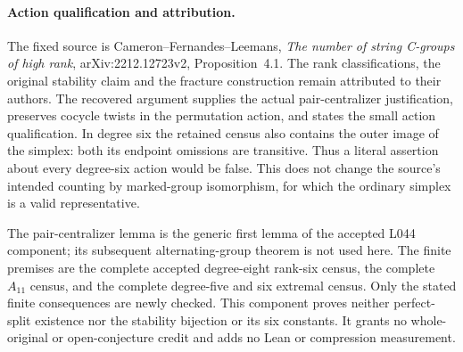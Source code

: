 \documentclass[11pt,a4paper]{article}
\begin{document}
\paragraph{Action qualification and attribution.}
The fixed source is Cameron--Fernandes--Leemans,
\emph{The number of string C-groups of high rank},
arXiv:2212.12723v2, Proposition~4.1. The rank classifications,
the original stability claim and the fracture construction
remain attributed to their authors. The recovered argument
supplies the actual pair-centralizer justification, preserves
cocycle twists in the permutation action, and states the small
action qualification. In degree six the retained census also
contains the outer image of the simplex: both its endpoint
omissions are transitive. Thus a literal assertion about every
degree-six action would be false. This does not change the
source's intended counting by marked-group isomorphism, for
which the ordinary simplex is a valid representative.

The pair-centralizer lemma is the generic first lemma of the
accepted L044 component; its subsequent alternating-group
theorem is not used here. The finite premises are the complete
accepted degree-eight rank-six census, the complete $A_{11}$
census, and the complete degree-five and six extremal census.
Only the stated finite consequences are newly checked.
This component proves neither perfect-split existence nor
the stability bijection or its six constants. It grants no
whole-original or open-conjecture credit and adds no Lean or
compression measurement.
\end{document}
